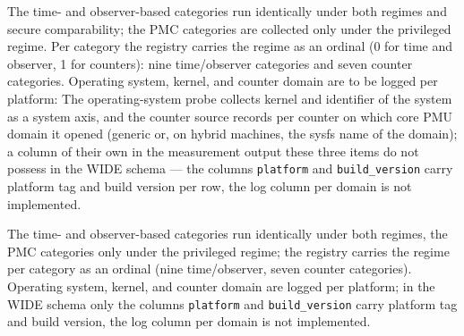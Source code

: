 \begin{nurlang}
The time- and observer-based categories run identically under both regimes and secure comparability;
the PMC categories are collected only under the privileged regime. Per category the registry carries
the regime as an ordinal (0 for time and observer, 1 for counters): nine time/observer categories and
seven counter categories. Operating system, kernel, and counter domain are to be logged per platform:
The operating-system probe collects kernel and identifier of the system as a system axis, and the
counter source records per counter on which core PMU domain it opened (generic or, on hybrid
machines, the sysfs name of the domain); a column of their own in the measurement output these three
items do not possess in the WIDE schema --- the columns \texttt{platform} and
\texttt{build\_version} carry platform tag and build version per row, the log column per domain is
not implemented.
\end{nurlang}
\begin{nurkurz}
The time- and observer-based categories run identically under both regimes, the PMC categories only under
the privileged regime; the registry carries the regime per category as an ordinal (nine time/observer, seven
counter categories). Operating system, kernel, and counter domain are logged per platform; in the WIDE
schema only the columns \texttt{platform} and \texttt{build\_version} carry platform tag and build version,
the log column per domain is not implemented.
\end{nurkurz}

